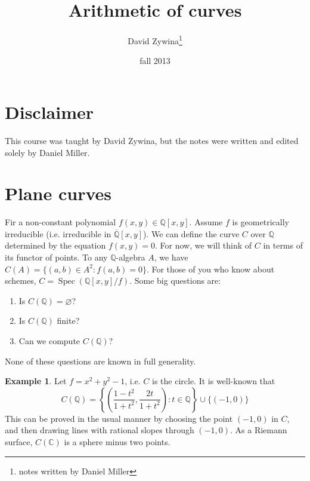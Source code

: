 \documentclass{article}
\title{Arithmetic of curves}
\author{David Zywina\thanks{notes written by Daniel Miller}}
\date{fall 2013}
\DeclareMathOperator{\spec}{Spec}
\theoremstyle{definition}
\newtheorem{example}[subsection]{Example}
\begin{document}
\maketitle











\section*{Disclaimer}

This course was taught by David Zywina, but the notes were written and 
edited solely by Daniel Miller. 










\section{Plane curves}

Fir a non-constant polynomial $f(x,y)\in\mathbb{Q}[x,y]$. Assume $f$ is 
geometrically irreducible (i.e. irreducible in $\overline{\mathbb{Q}}[x,y]$). 
We can define the curve $C$ over $\mathbb{Q}$ determined by the equation 
$f(x,y)=0$. For now, we will think of $C$ in terms of its functor of points. 
To any $\mathbb{Q}$-algebra $A$, we have $C(A)=\{(a,b)\in A^2:f(a,b)=0\}$. 
For those of you who know about schemes, 
$C=\spec\left(\mathbb{Q}[x,y]/f\right)$. Some big questions are:
\begin{enumerate}
  \item Is $C(\mathbb{Q})=\varnothing$?
  \item Is $C(\mathbb{Q})$ finite?
  \item Can we compute $C(\mathbb{Q})$?
\end{enumerate}
None of these questions are known in full generality. 

\begin{example}
Let $f=x^2+y^2-1$, i.e. $C$ is the circle. It is well-known that 
\[
  C(\mathbb{Q})=\left\{\left(\frac{1-t^2}{1+t^2},\frac{2t}{1+t^2}\right):t\in\mathbb{Q}\right\}\cup \{(-1,0)\}
\]
This can be proved in the usual manner by choosing the point 
$(-1,0)$ in $C$, and then drawing lines with rational slopes through 
$(-1,0)$. As a Riemann surface, $C(\mathbb{C})$ is a sphere minus 
two points. 
\end{example}
\end{document}
